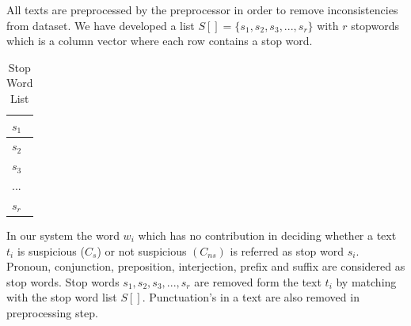 All texts are preprocessed by the preprocessor in order to remove inconsistencies from dataset. We have developed a list $S[]=\{s_1, s_2, s_3, ..., s_r\}$ with $r$ stopwords which is a column vector where each row contains a stop word.\par
\begin{table}[h!]
\begin{center}
\caption{Stop Word List}
\begin{tabular}{|m{0.7cm}|}
\hline
     $s_1$ \\
\hline
    $s_2$ \\
\hline 
    $s_3$ \\
\hline
 $...$ \\
 \hline
 $s_r$ \\
 \hline
\end{tabular}
\end{center}
\end{table}
\vspace{0.1cm}
In our system the word $w_i$ which has no contribution in deciding whether a text $t_i$ is suspicious ($C_s$) or not suspicious $(C_{ns})$ is referred as stop word $s_i$. Pronoun, conjunction, preposition, interjection, prefix and suffix are considered as stop words. Stop words $ s_1, s_2, s_3, ..., s_r$ are removed form the text $t_i$ by matching with the stop word list $S[]$. Punctuation's in a text are also removed in preprocessing step.


